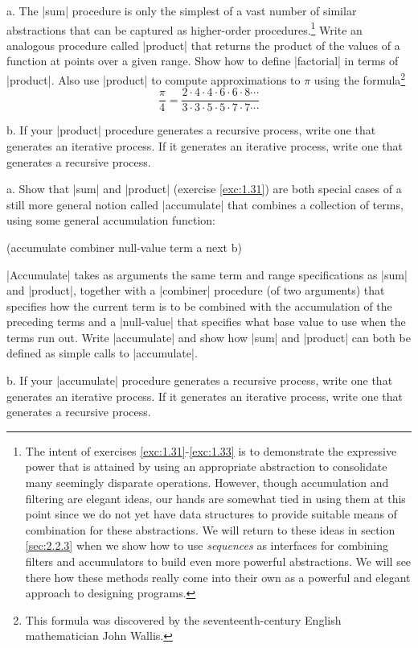 \begin{Exercise}
\label{exc:1.31}
a.  The \scheme|sum| procedure is only the simplest of a vast number
of similar abstractions that can be captured as higher-order
procedures.\footnote{The intent of exercises
  \ref{exc:1.31}-\ref{exc:1.33} is to demonstrate the expressive power
  that is attained by using an appropriate abstraction to consolidate
  many seemingly disparate operations.  However, though accumulation
  and filtering are elegant ideas, our hands are somewhat tied in
  using them at this point since we do not yet have data structures to
  provide suitable means of combination for these abstractions.  We
  will return to these ideas in section \ref{sec:2.2.3} when we show
  how to use \textit{sequences} as interfaces for combining filters
  and accumulators to build even more powerful abstractions.  We will
  see there how these methods really come into their own as a powerful
  and elegant approach to designing programs.} Write an analogous
procedure called \scheme|product| that returns the product of the
values of a function at points over a given range.  Show how to define
\scheme|factorial| in terms of \scheme|product|.  Also use
\scheme|product| to compute approximations to $\pi$ using the
formula\footnote{This formula was discovered by the seventeenth-century
English mathematician John Wallis.}
\begin{displaymath}
  \frac{\pi}{4} = 
  \frac{2 \cdot 4 \cdot 4 \cdot 6 \cdot 6 \cdot 8 \cdots} 
       {3 \cdot 3 \cdot 5 \cdot 5 \cdot 7 \cdot 7 \cdots}
\end{displaymath}

b.  If your \scheme|product|
procedure generates a recursive process, write one that generates
an iterative process.
If it generates an iterative process, write one that generates
a recursive process.
\end{Exercise}

\begin{Exercise}
\label{exc:1.32}
a. Show that \scheme|sum| and \scheme|product| (exercise
\ref{exc:1.31}) are both special cases of a still more general notion
called \scheme|accumulate| that combines a collection of terms, using
some general accumulation function:

\begin{schemedisplay}
(accumulate combiner null-value term a next b)
\end{schemedisplay}
\scheme|Accumulate| takes as arguments the same term and range
specifications as \scheme|sum| and \scheme|product|, together with a \scheme|combiner|
procedure (of two arguments) that specifies how the current
term is to be combined with the accumulation of the preceding terms
and a \scheme|null-value| that specifies what base value to use
when the terms run out.  Write \scheme|accumulate|
and show how \scheme|sum| and \scheme|product| can both
be defined as simple calls to \scheme|accumulate|.

b. If your \scheme|accumulate|
procedure generates a recursive process, write one that generates
an iterative process.
If it generates an iterative process, write one that generates
a recursive process.
\end{Exercise}


